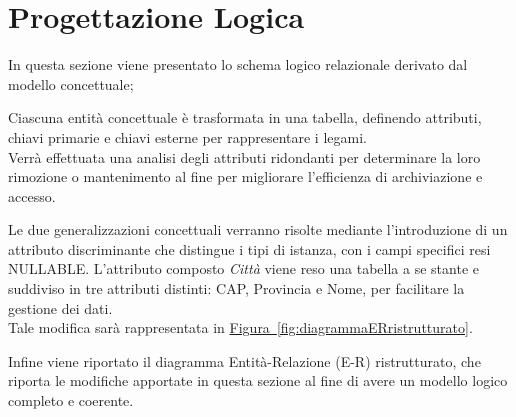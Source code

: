 \documentclass[10pt,twoside]{article}
\begin{document}
\section{Progettazione Logica}{
    In questa sezione viene presentato lo schema logico relazionale derivato dal modello concettuale;
    
    Ciascuna entità concettuale è trasformata in una tabella, definendo attributi, chiavi primarie e chiavi esterne per rappresentare i legami. \\
    Verrà effettuata una analisi degli attributi ridondanti per determinare la loro rimozione o mantenimento al fine per migliorare l’efficienza di archiviazione e accesso.
    
    Le due generalizzazioni concettuali verranno risolte mediante l’introduzione di un attributo discriminante che distingue i tipi di istanza, con i campi specifici resi NULLABLE.
    L'attributo composto \textit{Città} viene reso una tabella a se stante e suddiviso in tre attributi distinti: CAP, Provincia e Nome, per facilitare la gestione dei dati. \\
    Tale modifica sarà rappresentata in \hyperref[fig:diagrammaERristrutturato]{Figura~\ref*{fig:diagrammaERristrutturato}}.


    Infine viene riportato il diagramma Entità-Relazione (E-R) ristrutturato, che riporta le modifiche apportate in questa sezione al fine di avere un modello logico completo e coerente.

}
\end{document}

